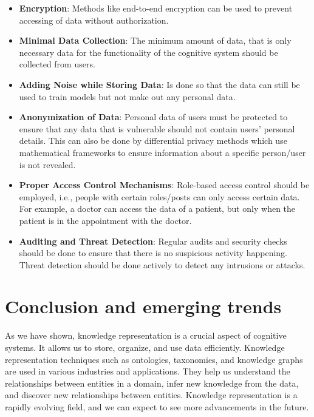\documentclass[12pt]{report}
\begin{document}
\begin{itemize}
  \item \textbf{Encryption}: Methods like end-to-end encryption can be used to
    prevent accessing of data without authorization.
  \item \textbf{Minimal Data Collection}: The minimum amount of data, that is
    only necessary data for the functionality of the cognitive system should be
    collected from users.
  \item \textbf{Adding Noise while Storing Data}: Is done so that the data can
    still be used to train models but not make out any personal data.
  \item \textbf{Anonymization of Data}: Personal data of users must be
    protected to ensure that any data that is vulnerable should not contain
    users' personal details. This can also be done by differential privacy
    methods which use mathematical frameworks to ensure information about a
    specific person/user is not revealed.
  \item \textbf{Proper Access Control Mechanisms}: Role-based access control
    should be employed, i.e., people with certain roles/posts can only access
    certain data. For example, a doctor can access the data of a patient, but
    only when the patient is in the appointment with the doctor.
  \item \textbf{Auditing and Threat Detection}: Regular audits and security
    checks should be done to ensure that there is no suspicious activity
    happening. Threat detection should be done actively to detect any
    intrusions or attacks.
\end{itemize}



\chapter{Conclusion and emerging trends}

As we have shown, knowledge representation is a crucial aspect of cognitive
systems. It allows us to store, organize, and use data efficiently. Knowledge
representation techniques such as ontologies, taxonomies, and knowledge graphs
are used in various industries and applications. They help us understand the
relationships between entities in a domain, infer new knowledge from the data,
and discover new relationships between entities. Knowledge representation is a
rapidly evolving field, and we can expect to see more advancements in the
future.

\renewcommand{\bibname}{References}

\end{document}
